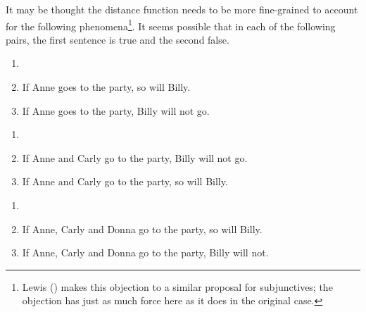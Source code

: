 \documentclass[
  10pt,
  letterpaper,
  DIV=11,
  numbers=noendperiod,
  twoside]{scrartcl}
\providecommand{\tightlist}{%
  \setlength{\itemsep}{0pt}\setlength{\parskip}{0pt}}\usepackage{longtable,booktabs,array}
\begin{document}
It may be thought the distance function needs to be more fine-grained to
account for the following phenomena\footnote{Lewis
  () makes this objection to a similar
  proposal for subjunctives; the objection has just as much force here
  as it does in the original case.}. It seems possible that in each of
the following pairs, the first sentence is true and the second false.

\begin{description}
\tightlist
\item[(19)]
\begin{enumerate}
\def\labelenumi{\alph{enumi}.}
\tightlist
\item[]
\item
  If Anne goes to the party, so will Billy.
\item
  If Anne goes to the party, Billy will not go.
\end{enumerate}
\item[(20)]
\begin{enumerate}
\def\labelenumi{\alph{enumi}.}
\tightlist
\item[]
\item
  If Anne and Carly go to the party, Billy will not go.
\item
  If Anne and Carly go to the party, so will Billy.
\end{enumerate}
\item[(21)]
\begin{enumerate}
\def\labelenumi{\alph{enumi}.}
\tightlist
\item[]
\item
  If Anne, Carly and Donna go to the party, so will Billy.
\item
  If Anne, Carly and Donna go to the party, Billy will not.
\end{enumerate}
\end{description}
\end{document}
